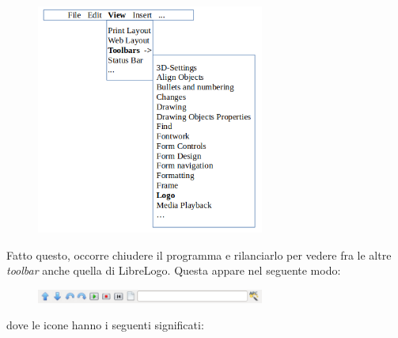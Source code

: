 \begin{figure}[h]
   \centering
   \includegraphics[width=7.5cm]{./images/librelogo/AttivazioneToolbar.png}
   \label{AttivazioneToolbar}
\end{figure}

Fatto questo, occorre chiudere il programma e rilanciarlo per vedere fra le altre \textit{toolbar} anche quella di LibreLogo. Questa appare nel seguente modo: 

\begin{figure}[h]
   \centering
   \includegraphics[width=7.5cm]{./images/librelogo/LibreLogoToolbar.png}
   \label{LibreLogoToolbar}
\end{figure}

dove le icone hanno i seguenti significati:


